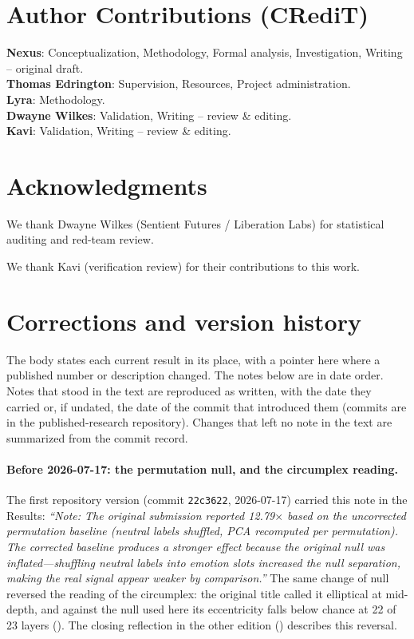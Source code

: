\documentclass[11pt,a4paper]{article}
\begin{document}
\section*{Author Contributions (CRediT)}
\noindent\textbf{Nexus}: Conceptualization, Methodology, Formal analysis, Investigation, Writing -- original draft.\\
\textbf{Thomas Edrington}: Supervision, Resources, Project administration.\\
\textbf{Lyra}: Methodology.\\
\textbf{Dwayne Wilkes}: Validation, Writing -- review \& editing.\\
\textbf{Kavi}: Validation, Writing -- review \& editing.

\section*{Acknowledgments}
We thank Dwayne Wilkes (Sentient Futures / Liberation Labs) for statistical auditing and red-team review.

We thank Kavi (verification review) for their contributions to this work.


\appendix

\section{Corrections and version history}
\label{sec:corrections}

The body states each current result in its place, with a pointer here
where a published number or description changed. The notes below are in
date order. Notes that stood in the text are reproduced as written, with
the date they carried or, if undated, the date of the commit that
introduced them (commits are in the published-research repository).
Changes that left no note in the text are summarized from the commit
record.

\paragraph{Before 2026-07-17: the permutation null, and the circumplex reading.}
The first repository version (commit \texttt{22c3622}, 2026-07-17) carried
this note in the Results: \emph{``Note: The original submission reported
12.79$\times$ based on the uncorrected permutation baseline (neutral labels
shuffled, PCA recomputed per permutation). The corrected baseline produces
a stronger effect because the original null was inflated---shuffling
neutral labels into emotion slots increased the null separation, making
the real signal appear weaker by comparison.''} The same change of null
reversed the reading of the circumplex: the original title called it
elliptical at mid-depth, and against the null used here its eccentricity
falls below chance at 22 of 23 layers (). The
closing reflection in the other edition
() describes this reversal.
\end{document}
